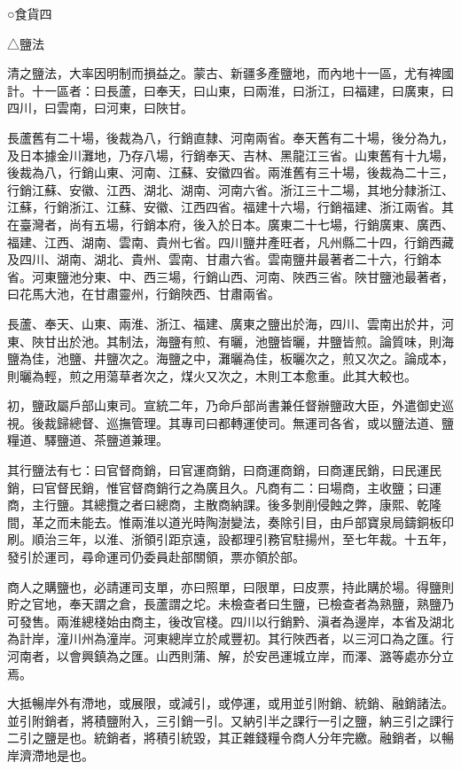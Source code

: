 
\begin{pinyinscope}
○食貨四

△鹽法

清之鹽法，大率因明制而損益之。蒙古、新疆多產鹽地，而內地十一區，尤有裨國計。十一區者：曰長蘆，曰奉天，曰山東，曰兩淮，曰浙江，曰福建，曰廣東，曰四川，曰雲南，曰河東，曰陜甘。

長蘆舊有二十場，後裁為八，行銷直隸、河南兩省。奉天舊有二十場，後分為九，及日本據金川灘地，乃存八場，行銷奉天、吉林、黑龍江三省。山東舊有十九場，後裁為八，行銷山東、河南、江蘇、安徽四省。兩淮舊有三十場，後裁為二十三，行銷江蘇、安徽、江西、湖北、湖南、河南六省。浙江三十二場，其地分隸浙江、江蘇，行銷浙江、江蘇、安徽、江西四省。福建十六場，行銷福建、浙江兩省。其在臺灣者，尚有五場，行銷本府，後入於日本。廣東二十七場，行銷廣東、廣西、福建、江西、湖南、雲南、貴州七省。四川鹽井產旺者，凡州縣二十四，行銷西藏及四川、湖南、湖北、貴州、雲南、甘肅六省。雲南鹽井最著者二十六，行銷本省。河東鹽池分東、中、西三場，行銷山西、河南、陜西三省。陜甘鹽池最著者，曰花馬大池，在甘肅靈州，行銷陜西、甘肅兩省。

長蘆、奉天、山東、兩淮、浙江、福建、廣東之鹽出於海，四川、雲南出於井，河東、陜甘出於池。其制法，海鹽有煎、有曬，池鹽皆曬，井鹽皆煎。論質味，則海鹽為佳，池鹽、井鹽次之。海鹽之中，灘曬為佳，板曬次之，煎又次之。論成本，則曬為輕，煎之用蕩草者次之，煤火又次之，木則工本愈重。此其大較也。

初，鹽政屬戶部山東司。宣統二年，乃命戶部尚書兼任督辦鹽政大臣，外遣御史巡視。後裁歸總督、巡撫管理。其專司曰都轉運使司。無運司各省，或以鹽法道、鹽糧道、驛鹽道、茶鹽道兼理。

其行鹽法有七：曰官督商銷，曰官運商銷，曰商運商銷，曰商運民銷，曰民運民銷，曰官督民銷，惟官督商銷行之為廣且久。凡商有二：曰場商，主收鹽；曰運商，主行鹽。其總攬之者曰總商，主散商納課。後多剝削侵蝕之弊，康熙、乾隆間，革之而未能去。惟兩淮以道光時陶澍變法，奏除引目，由戶部寶泉局鑄銅板印刷。順治三年，以淮、浙領引距京遠，設都理引務官駐揚州，至七年裁。十五年，發引於運司，尋命運司仍委員赴部關領，票亦領於部。

商人之購鹽也，必請運司支單，亦曰照單，曰限單，曰皮票，持此購於場。得鹽則貯之官地，奉天謂之倉，長蘆謂之坨。未檢查者曰生鹽，已檢查者為熟鹽，熟鹽乃可發售。兩淮總棧始由商主，後改官棧。四川以行銷黔、滇者為邊岸，本省及湖北為計岸，潼川州為潼岸。河東總岸立於咸豐初。其行陜西者，以三河口為之匯。行河南者，以會興鎮為之匯。山西則蒲、解，於安邑運城立岸，而澤、潞等處亦分立焉。

大抵暢岸外有滯地，或展限，或減引，或停運，或用並引附銷、統銷、融銷諸法。並引附銷者，將積鹽附入，三引銷一引。又納引半之課行一引之鹽，納三引之課行二引之鹽是也。統銷者，將積引統毀，其正雜錢糧令商人分年完繳。融銷者，以暢岸濟滯地是也。


\end{pinyinscope}
